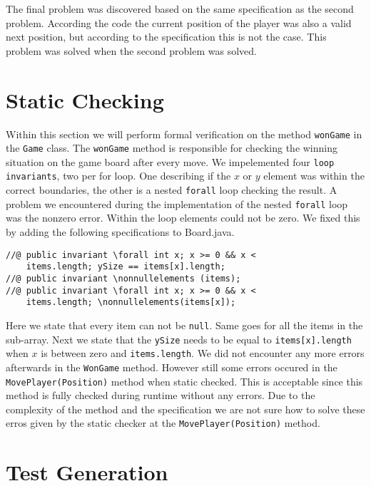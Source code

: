 \documentclass[a4paper]{article}
\begin{document}
	The final problem was discovered based on the same specification as the second problem. According the code the current position of the player was also a valid next position, but according to the specification this is not the case. This problem was solved when the second problem was solved.
	
	\newpage
	\section{Static Checking}
	\label{Static Checking}
	Within this section we will perform formal verification on the method \texttt{wonGame} in the \texttt{Game} class. The \texttt{wonGame} method is responsible for checking the winning situation on the game board after every move.
	\newline 
	We impelemented four \texttt{loop invariants}, two per for loop. One describing if the $x$ or $y$ element was within the correct boundaries, the other is a nested \texttt{forall} loop checking the result. 
	A problem we encountered during the implementation of the nested \texttt{forall} loop was the nonzero error. Within the loop elements could not be zero. We fixed this by adding the following specifications to Board.java.
	\begin{lstlisting}
//@ public invariant \forall int x; x >= 0 && x <
    items.length; ySize == items[x].length;
//@ public invariant \nonnullelements (items);
//@ public invariant \forall int x; x >= 0 && x <
    items.length; \nonnullelements(items[x]);	
	\end{lstlisting}
	Here we state that every item can not be \texttt{null}. Same goes for all the items in the sub-array. Next we state that the \texttt{ySize} needs to be equal to \texttt{items[x].length} when $x$ is between zero and \texttt{items.length}. 
	\newline
	We did not encounter any more errors afterwards in the \texttt{WonGame} method. However still some errors occured in the \texttt{MovePlayer(Position)} method when static checked. This is acceptable since this method is fully checked during runtime without any errors. Due to the complexity of the method and the specification we are not sure how to solve these erros given by the static checker at the \texttt{MovePlayer(Position)} method.
	
	\section{Test Generation}
	
	
	
\end{document}
